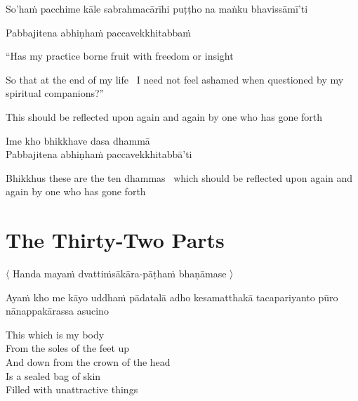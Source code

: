 
\begin{pali-hangtogether}
So'haṁ pacchime kāle sabrahmacārīhi puṭṭho na maṅku bhavissāmī'ti\\
\end{pali-hangtogether}
Pabbajitena abhiṇhaṁ paccavekkhitabbaṁ


\begin{english}
  ``Has my practice borne fruit with freedom or insight
\begin{english-hangtogether}
  So that at the end of my life \breathmark\ I need not feel ashamed when questioned by my spiritual companions?''
\end{english-hangtogether}
\begin{english-hangtogether}
  This should be reflected upon again and again by one who has gone forth
\end{english-hangtogether}
\end{english}

Ime kho bhikkhave dasa dhammā\\
Pabbajitena abhiṇhaṁ paccavekkhitabbā'ti

\begin{english-hangtogether}
  Bhikkhus these are the ten dhammas \breathmark\ which should be reflected upon again and again by one who has gone forth
\end{english-hangtogether}

\suttaRef{[AN 10.48]}


\section{The Thirty-Two Parts}
\label{32-parts}

\begin{leader}
  〈 Handa mayaṁ dvattiṁsākāra-pāṭhaṁ bhaṇāmase 〉
\end{leader}

\begin{pali-hang}
Ayaṁ kho me kāyo uddhaṁ pādatalā adho kesamatthakā tacapariyanto pūro nānappakārassa asucino
\end{pali-hang}

\begin{english-verses}
  This which is my body\\
  From the soles of the feet up\\
  And down from the crown of the head\\
  Is a sealed bag of skin\\
  Filled with unattractive things
\end{english-verses}


